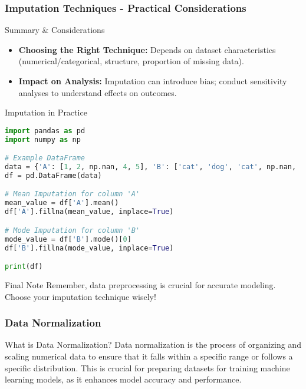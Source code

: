 \documentclass[aspectratio=169]{beamer}
\begin{document}
\begin{frame}[fragile]
    \frametitle{Imputation Techniques - Practical Considerations}
    \begin{block}{Summary & Considerations}
        \begin{itemize}
            \item \textbf{Choosing the Right Technique:} Depends on dataset characteristics (numerical/categorical, structure, proportion of missing data).
            \item \textbf{Impact on Analysis:} Imputation can introduce bias; conduct sensitivity analyses to understand effects on outcomes.
        \end{itemize}
    \end{block}

    \begin{block}{Imputation in Practice}
        \begin{lstlisting}[language=Python]
import pandas as pd
import numpy as np

# Example DataFrame
data = {'A': [1, 2, np.nan, 4, 5], 'B': ['cat', 'dog', 'cat', np.nan, 'dog']}
df = pd.DataFrame(data)

# Mean Imputation for column 'A'
mean_value = df['A'].mean()
df['A'].fillna(mean_value, inplace=True)

# Mode Imputation for column 'B'
mode_value = df['B'].mode()[0]
df['B'].fillna(mode_value, inplace=True)

print(df)
        \end{lstlisting}
    \end{block}

    \begin{block}{Final Note}
        Remember, data preprocessing is crucial for accurate modeling. Choose your imputation technique wisely!
    \end{block}
\end{frame}

\begin{frame}[fragile]
    \frametitle{Data Normalization}
    \begin{block}{What is Data Normalization?}
        Data normalization is the process of organizing and scaling numerical data to ensure that it falls within a specific range or follows a specific distribution. 
        This is crucial for preparing datasets for training machine learning models, as it enhances model accuracy and performance. 
    \end{block}
\end{frame}
\end{document}
